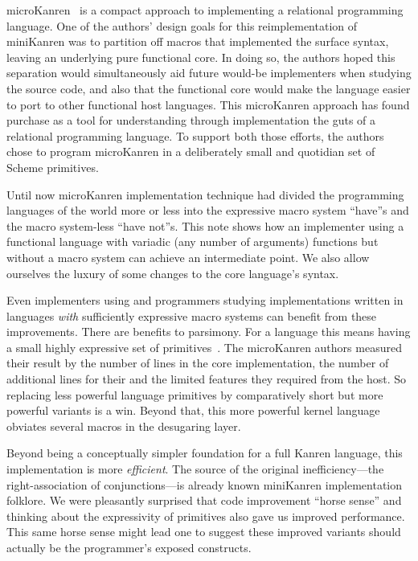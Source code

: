 \documentclass[sigplan,screen,draft,anonymous,review,natbib=false]{acmart}
\begin{document}
microKanren~\cite{hemann2013muKanren} is a compact approach to
implementing a relational programming language. One of the authors'
design goals for this reimplementation of miniKanren was to partition
off macros that implemented the surface syntax, leaving an underlying
pure functional core. In doing so, the authors hoped this separation
would simultaneously aid future would-be implementers when studying
the source code, and also that the functional core would make the
language easier to port to other functional host languages. This
microKanren approach has found purchase as a tool for understanding
through implementation the guts of a relational programming language.
To support both those efforts, the authors chose to program
microKanren in a deliberately small and quotidian set of Scheme
primitives.

Until now microKanren implementation technique had divided the
programming languages of the world more or less into the expressive
macro system \enquote{have}s and the macro system-less \enquote{have
  not}s. This note shows how an implementer using a functional
language with variadic (any number of arguments) functions but without
a macro system can achieve an intermediate point. We also allow
ourselves the luxury of some changes to the core language's syntax.

Even implementers using and programmers studying implementations
written in languages \emph{with} sufficiently expressive macro systems
can benefit from these improvements. There are benefits to parsimony.
For a language this means having a small highly expressive set of
primitives~\cite{somedescriptionofscheme}. The microKanren authors
measured their result by the number of lines in the core
implementation, the number of additional lines for their and the
limited features they required from the host. So replacing less
powerful language primitives by comparatively short but more powerful
variants is a win. Beyond that, this more powerful kernel language
obviates several macros in the desugaring layer.

Beyond being a conceptually simpler foundation for a full Kanren
language, this implementation is more \emph{efficient}. The source of
the original inefficiency---the right-association of conjunctions---is
already known miniKanren implementation folklore. We were pleasantly
surprised that code improvement \enquote{horse sense} and thinking
about the expressivity of primitives also gave us improved
performance. This same horse sense might lead one to suggest these
improved variants should actually be the programmer's exposed
constructs.
\end{document}
